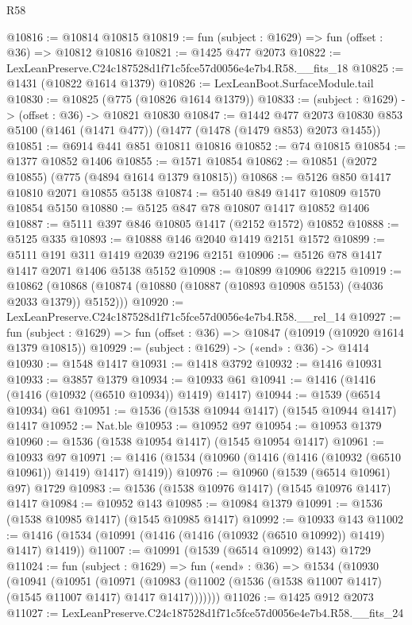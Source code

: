 \begin{lexlean}{R58}
\begin{coremodule}
{{@10816 := @10814 @10815
@10819 := fun (subject : @1629) => fun (offset : @36) => @10812 @10816
@10821 := @1425 @477 @2073
@10822 := LexLeanPreserve.C24c187528d1f71c5fce57d0056e4e7b4.R58.__fits_18
@10825 := @1431 (@10822 @1614 @1379)
@10826 := LexLeanBoot.SurfaceModule.tail
@10830 := @10825 (@775 (@10826 @1614 @1379))
@10833 := (subject : @1629) -> (offset : @36) -> @10821 @10830
@10847 := @1442
    @477
    @2073
    @10830
    @853
    @5100
    (@1461 (@1471 @477))
    (@1477 (@1478 (@1479 @853) @2073 @1455))
@10851 := @6914 @441 @851 @10811 @10816
@10852 := @74 @10815
@10854 := @1377 @10852 @1406
@10855 := @1571 @10854
@10862 := @10851 (@2072 @10855) (@775 (@4894 @1614 @1379 @10815))
@10868 := @5126 @850 @1417 @10810 @2071 @10855 @5138
@10874 := @5140 @849 @1417 @10809 @1570 @10854 @5150
@10880 := @5125 @847 @78 @10807 @1417 @10852 @1406
@10887 := @5111 @397 @846 @10805 @1417 (@2152 @1572) @10852
@10888 := @5125 @335
@10893 := @10888 @146 @2040 @1419 @2151 @1572
@10899 := @5111 @191 @311 @1419 @2039 @2196 @2151
@10906 := @5126 @78 @1417 @1417 @2071 @1406 @5138 @5152
@10908 := @10899 @10906 @2215
@10919 := @10862 (@10868 (@10874 (@10880 (@10887 (@10893 @10908 @5153) (@4036 @2033 @1379)) @5152)))
@10920 := LexLeanPreserve.C24c187528d1f71c5fce57d0056e4e7b4.R58.__rel_14
@10927 := fun (subject : @1629) => fun (offset : @36) => @10847 (@10919 (@10920 @1614 @1379 @10815))
@10929 := (subject : @1629) -> («end» : @36) -> @1414
@10930 := @1548 @1417
@10931 := @1418 @3792
@10932 := @1416 @10931
@10933 := @3857 @1379
@10934 := @10933 @61
@10941 := @1416 (@1416 (@1416 (@10932 (@6510 @10934)) @1419) @1417)
@10944 := @1539 (@6514 @10934) @61
@10951 := @1536 (@1538 @10944 @1417) (@1545 @10944 @1417) @1417
@10952 := Nat.ble
@10953 := @10952 @97
@10954 := @10953 @1379
@10960 := @1536 (@1538 @10954 @1417) (@1545 @10954 @1417)
@10961 := @10933 @97
@10971 := @1416 (@1534 (@10960 (@1416 (@1416 (@10932 (@6510 @10961)) @1419) @1417) @1419))
@10976 := @10960 (@1539 (@6514 @10961) @97) @1729
@10983 := @1536 (@1538 @10976 @1417) (@1545 @10976 @1417) @1417
@10984 := @10952 @143
@10985 := @10984 @1379
@10991 := @1536 (@1538 @10985 @1417) (@1545 @10985 @1417)
@10992 := @10933 @143
@11002 := @1416 (@1534 (@10991 (@1416 (@1416 (@10932 (@6510 @10992)) @1419) @1417) @1419))
@11007 := @10991 (@1539 (@6514 @10992) @143) @1729
@11024 := fun (subject : @1629) =>
  fun («end» : @36) =>
  @1534
    (@10930
      (@10941
        (@10951
          (@10971
            (@10983 (@11002 (@1536 (@1538 @11007 @1417) (@1545 @11007 @1417) @1417 @1417)))))))
@11026 := @1425 @912 @2073
@11027 := LexLeanPreserve.C24c187528d1f71c5fce57d0056e4e7b4.R58.__fits_24
}}
\end{coremodule}
\end{lexlean}
